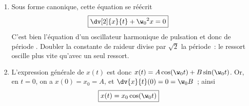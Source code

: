 \documentclass[a4paper, 12pt, final, garamond]{book}
\begin{document}
{\begin{enumerate}
\begin{equation*}
                \boxed{m \dv[2]{x}{t} + 2kx = 0} \Leftrightarrow \boxed{\dv[2]{x}{t} +
                \frac{2k}{m}x = 0}
            \end{equation*}
            La projection sur $\uy$ montre que la réaction du support compense
            le poids.
        \item Sous forme canonique, cette équation se réécrit
            \begin{equation*}
                \boxed{ \dv[2]{x}{t} + \w_0{}^2x = 0}
            \end{equation*}
            C'est bien l'équation d'un oscillateur harmonique de pulsation
             et donc de période . Doubler la
            constante de raideur divise par $\sqrt{2}$ la période~: le ressort
            oscille plus vite qu'avec un seul ressort.
        \item L'expression générale de $x(t)$ est donc $x(t) = A\cos(\w_0t) +
            B\sin(\w_0t)$. Or, en $t=0$, on a $x(0) = x_0 = A$, et $ \dv{x}{t}
            (0) = 0 = \w_0 B$~; ainsi
            \begin{equation*}
                \boxed{x(t) = x_0\cos(\w_0t)}
            \end{equation*}
    \end{enumerate}
}
\end{document}
